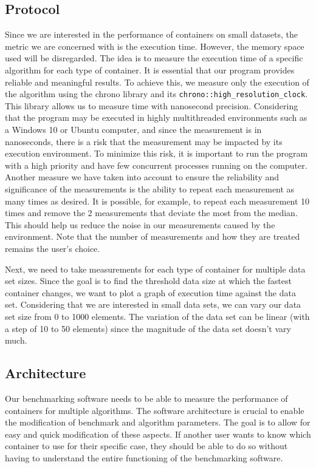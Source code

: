 \documentclass[conference]{IEEEtran} \IEEEoverridecommandlockouts \usepackage{graphicx}
\def\code#1{\texttt{#1}}
\begin{document}
\subsection{Protocol}

Since we are interested in the performance of containers on small datasets, the metric we
are concerned with is the execution time. However, the memory space used will be
disregarded. The idea is to measure the execution time of a specific algorithm for each
type of container. It is essential that our program provides reliable and meaningful
results. To achieve this, we measure only the execution of the algorithm using the chrono
library and its \code{chrono::high\_resolution\_clock}. This library allows us to measure
time with nanosecond precision. Considering that the program may be executed in highly
multithreaded environments such as a Windows 10 or Ubuntu computer, and since the
measurement is in nanoseconds, there is a risk that the measurement may be impacted by its
execution environment. To minimize this risk, it is important to run the program with a
high priority and have few concurrent processes running on the computer. Another
measure we have taken into account to ensure the reliability and significance of the
measurements is the ability to repeat each measurement as many times as desired. It is
possible, for example, to repeat each measurement 10 times and remove the 2 measurements
that deviate the most from the median. This should help us reduce the noise in our
measurements caused by the environment. Note that the number of measurements and how they
are treated remains the user's choice.

Next, we need to take measurements for each type of container for multiple data set
sizes. Since the goal is to find the threshold data size at which the fastest container
changes, we want to plot a graph of execution time against the data set. Considering that
we are interested in small data sets, we can vary our data set size from 0 to 1000
elements. The variation of the data set can be linear (with a step of 10 to 50 elements)
since the magnitude of the data set doesn't vary much.

\subsection{Architecture}

Our benchmarking software needs to be able to measure the performance of containers for
multiple algorithms. The software architecture is crucial to enable the modification of
benchmark and algorithm parameters. The goal is to allow for easy and quick modification
of these aspects. If another user wants to know which container to use for their specific
case, they should be able to do so without having to understand the entire functioning of
the benchmarking software.
\end{document}
